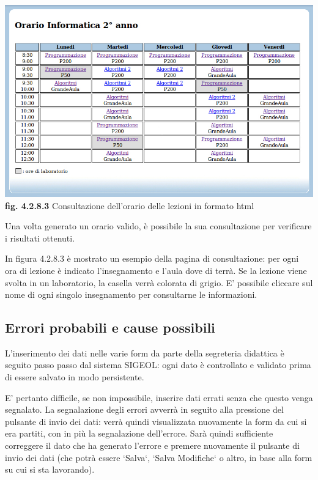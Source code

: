 \documentclass[11pt,a4paper]{article}
\begin{document}
\bigskip
\begin{center}
	\includegraphics[scale=0.42]{images/visualizzazione_orario.jpg}\\
	\textbf{fig. 4.2.8.3} Consultazione dell'orario delle lezioni in formato html\\
\end{center}
\bigskip

Una volta generato un orario valido, è possibile la sua consultazione per verificare i risultati ottenuti.

In figura 4.2.8.3 è mostrato un esempio della pagina di consultazione: per ogni ora di lezione è indicato l'insegnamento e l'aula dove di terrà. Se la lezione viene svolta in un laboratorio, la casella verrà colorata di grigio. E' possibile cliccare sul nome di ogni singolo insegnamento per consultarne le informazioni.
\subsection{Errori probabili e cause possibili}
L'inserimento dei dati nelle varie form da parte della segreteria didattica è seguito passo passo dal sistema SIGEOL: ogni dato è controllato e validato prima di essere salvato in modo persistente.

E' pertanto difficile, se non impossibile, inserire dati errati senza che questo venga segnalato.
La segnalazione degli errori avverrà in seguito alla pressione del pulsante di invio dei dati: verrà quindi visualizzata nuovamente la form da cui si era partiti, con in più la segnalazione dell'errore. Sarà quindi sufficiente correggere il dato che ha generato l'errore e premere nuovamente il pulsante di invio dei dati (che potrà essere `Salva`, `Salva Modifiche` o altro, in base alla form su cui si sta lavorando).
\end{document}
